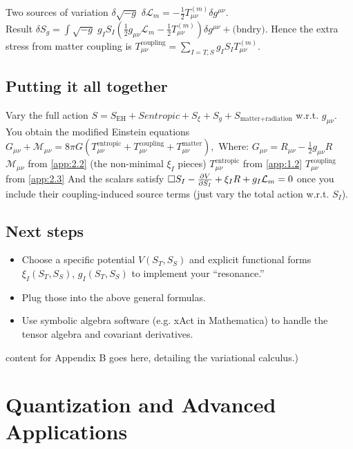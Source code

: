 \documentclass[11pt,a4paper]{article}
\newcommand{\Mmu}{\mathcal{M}}
\newcommand{\SEH}{S_\mathrm{EH}}
\newcommand{\ST}{S_T}
\newcommand{\SSp}{S_S}
\newcommand{\Smatterradiation}{S_{\text{matter+radiation}}}
\newcommand{\Lm}{\mathcal{L}_m}
\newcommand{\Tmnentropic}{T^{\text{entropic}}_{\mu\nu}}
\newcommand{\Tmnm}{T_{\mu\nu}^{(m)}}
\newcommand{\Tmncoupling}{T^{\text{coupling}}_{\mu\nu}}
\newcommand{\Tmnmatter}{T^{\text{matter}}_{\mu\nu}}
\begin{document}
Two sources of variation
$\delta\sqrt{-g}$
$\delta\Lm=-\frac{1}{2}\Tmnm\delta g^{\mu\nu}.$ \\
Result
$\delta S_g =\int\sqrt{-g}\;g_I S_I\left(\frac{1}{2}g_{\mu\nu}\Lm-\frac{1}{2}\Tmnm\right)\delta g^{\mu\nu} +\text{(bndry)}.$
Hence the extra stress from matter coupling is
$\Tmncoupling=\sum_{I=T,S}g_I S_I\Tmnm.$

\subsection{Putting it all together}
\label{app:B.4}
Vary the full action
$S=\SEH+Sentropic+S_\xi+S_g+\Smatterradiation$
w.r.t. $g_{\mu\nu}$. You obtain the modified Einstein equations
$G_{\mu\nu}+\Mmu_{\mu\nu}=8\pi G(\Tmnentropic+\Tmncoupling+\Tmnmatter),$
Where:
$G_{\mu\nu}=R_{\mu\nu}-\frac{1}{2}g_{\mu\nu}R$
$\Mmu_{\mu\nu}$ from \cref{app:2.2} (the non-minimal $\xi_I$ pieces)
$\Tmnentropic$ from \cref{app:1.2}
$\Tmncoupling$ from \cref{app:2.3}
And the scalars satisfy
$\Box S_I-\pdv{V}{S_I}+\xi_I R+g_I\Lm=0$
once you include their coupling-induced source terms (just vary the total action w.r.t. $S_I$).

\subsection{Next steps}
\begin{itemize}
    \item Choose a specific potential $V(\ST,\SSp)$ and explicit functional forms $\xi_I(\ST,\SSp)$, $g_I(\ST,\SSp)$ to implement your ``resonance.''
    \item Plug those into the above general formulas.
    \item Use symbolic algebra software (e.g. xAct in Mathematica) to handle the tensor algebra and covariant derivatives.
\end{itemize}content for Appendix B goes here, detailing the variational calculus.)

\section{Quantization and Advanced Applications}
\label{app:quantization}
\end{document}
